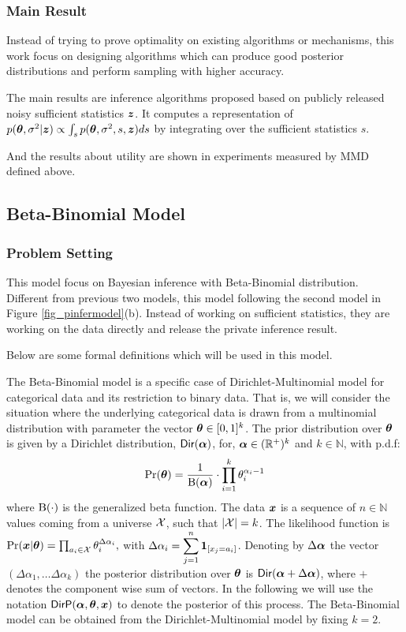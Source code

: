 \documentclass{article}
\begin{document}
\subsubsection{Main Result}
%
Instead of trying to prove optimality on existing algorithms or mechanisms, this work focus on designing algorithms which can produce good posterior distributions and perform sampling with higher accuracy.
%

The main results are inference algorithms proposed based on publicly released noisy sufficient statistics $\boldsymbol{z}$. 
It computes a representation of
$ p(\boldsymbol{\theta}, \sigma^2 | \boldsymbol{z}) \propto \int_{s}   p( \boldsymbol{\theta}, \sigma^2, s, \boldsymbol{z}) ds$ by integrating over the sufficient statistics $s$.

%
%
And the results about utility are shown in experiments measured by MMD defined above.

\subsection{Beta-Binomial Model
\texorpdfstring{\cite{Zhang2017privbayes}}{}}
\label{sec_betabi}
%

\subsubsection{Problem Setting}
%
This model focus on Bayesian inference with Beta-Binomial distribution.
%
Different from previous two models, this model following the second model in Figure \ref{fig_pinfermodel}(b). Instead of working on sufficient statistics, they are working on the data directly and release the private inference result. 

%
Below are some formal definitions which will be used in this model.

\begin{defn}
The Beta-Binomial model is a specific case of Dirichlet-Multinomial model for
categorical data and its restriction to binary data.
That is, we will consider the situation where 
the underlying categorical data is drawn from a multinomial
distribution with parameter the vector $\boldsymbol{\theta}\in [0,1]^{k}$. The prior distribution over $\boldsymbol{\theta}$
is given by a Dirichlet distribution, $\mathsf{Dir}(\boldsymbol{\alpha})$, for,
$\boldsymbol{\alpha}\in(\mathbb{R}^{+})^{k}$ and $k\in\mathbb{N}$, with p.d.f:
\[
\Pr(\boldsymbol{\theta})=\frac{1}{\boldsymbol{\textup{B}}(\boldsymbol{\alpha})}\cdot\prod_{i=1}^{k}{\theta_i^{\alpha_i-1}}
\]
where $\boldsymbol{\textup{B}}(\cdot)$ is the generalized beta function.
The data $\boldsymbol{x}$ is a sequence of $n\in\mathbb{N}$ values
coming from a universe $\mathcal{X}$, such that $|\mathcal{X}|=k$.
The likelihood function is
$
\Pr(\boldsymbol{x}|\boldsymbol{\theta})=\prod_{a_i\in\mathcal{X}}\theta_{i}^{\Delta \alpha_i},
$
with $\Delta \alpha_i=\displaystyle\sum_{j=1}^{n}\mathbf{1}_{[x_j=a_i]}$.
Denoting by $\Delta\boldsymbol{\alpha}$ the vector $(\Delta\alpha_1,\dots
\Delta\alpha_k)$ the posterior distribution over $\boldsymbol{\theta}$ is
$\mathsf{Dir}(\boldsymbol{\alpha} + \Delta \boldsymbol{\alpha})$, where $+$ denotes the component wise sum of vectors.
In the following we will use the notation $\mathsf{DirP}(\boldsymbol{\alpha},\boldsymbol{\theta},
\boldsymbol{x})$ to denote the posterior of this process.
The Beta-Binomial model can be obtained from the Dirichlet-Multinomial
model by fixing $k=2$. 
\end{defn}
\end{document}
